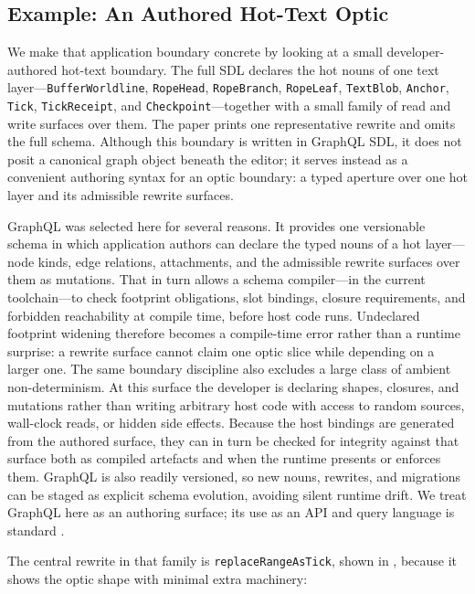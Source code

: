 \documentclass{aion}
\begin{document}
\subsection{Example: An Authored Hot-Text Optic}
We make that application boundary concrete by looking at a small
developer-authored hot-text boundary. The
full SDL declares the hot nouns of one text layer---\texttt{BufferWorldline},
\texttt{RopeHead}, \texttt{RopeBranch}, \texttt{RopeLeaf}, \texttt{TextBlob},
\texttt{Anchor}, \texttt{Tick}, \texttt{TickReceipt}, and
\texttt{Checkpoint}---together with a small family of read and write surfaces
over them. The paper prints one representative rewrite and omits the full
schema. Although this boundary is written in GraphQL SDL, it does not posit
a canonical graph object beneath the editor; it serves instead as a convenient
authoring syntax for an optic boundary: a typed aperture over one hot layer and
its admissible rewrite surfaces.

GraphQL was selected here for several reasons. It provides one versionable
schema in which application authors can declare the typed nouns of a hot
layer---node kinds, edge relations, attachments, and the admissible rewrite
surfaces over them as mutations. That in turn allows a schema
compiler---in the current toolchain---to check footprint obligations, slot
bindings, closure requirements, and forbidden reachability at compile time,
before host code runs. Undeclared footprint widening therefore becomes a
compile-time error rather than a runtime surprise: a rewrite surface cannot
claim one optic slice while depending on a larger one.
The same boundary discipline also excludes a large class of ambient
non-determinism. At this surface the developer is declaring shapes, closures,
and mutations rather than writing arbitrary host code with access to random
sources, wall-clock reads, or hidden side effects. Because the host bindings
are generated from the authored surface, they can in turn be checked for
integrity against that surface both as compiled artefacts and when the runtime
presents or enforces them. GraphQL is also readily versioned, so new nouns,
rewrites, and migrations can be staged as explicit schema evolution, avoiding
silent runtime drift.
We treat GraphQL here as an authoring surface; its use as an API and query
language is standard \cite{GraphQLSpec}.

The central rewrite in that family is \texttt{replaceRangeAsTick}, shown in
, because it
shows the optic shape with minimal extra machinery:
\end{document}
